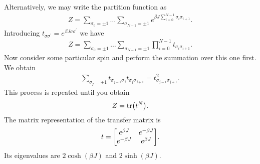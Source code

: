 Alternatively, we may write the partition function as
\begin{align*}
	Z = \sum\limits_{\sigma_{0} = \pm 1}\dots \sum\limits_{\sigma_{N - 1} = \pm 1}e^{\beta J\sum\limits_{i = 0}^{N - 1}\sigma_{i}\sigma_{i + 1}}.
\end{align*}
Introducing $t_{\sigma\sigma^{\prime}} = e^{\beta J\sigma\sigma^{\prime}}$ we have
\begin{align*}
	Z = \sum\limits_{\sigma_{0} = \pm 1}\dots \sum\limits_{\sigma_{N - 1} = \pm 1}\prod\limits_{i = 0}^{N - 1}t_{\sigma_{i}\sigma_{i + 1}}.
\end{align*}
Now consider some particular spin and perform the summation over this one first. We obtain
\begin{align*}
	\sum\limits_{\sigma_{j} = \pm 1}t_{\sigma_{j - 1}\sigma_{j}}t_{\sigma_{j}\sigma_{j + 1}} = t_{\sigma_{j - 1}\sigma_{j + 1}}^{2}.
\end{align*}
This process is repeated until you obtain
\begin{align*}
	Z = \tr(t^{N}).
\end{align*}
The matrix representation of the transfer matrix is
\begin{align*}
	t =
	\mqty[
		e^{\beta J}  & e^{-\beta J} \\
		e^{-\beta J} & e^{\beta J}
	].
\end{align*}
Its eigenvalues are $2\cosh(\beta J)$ and $2\sinh(\beta J)$.